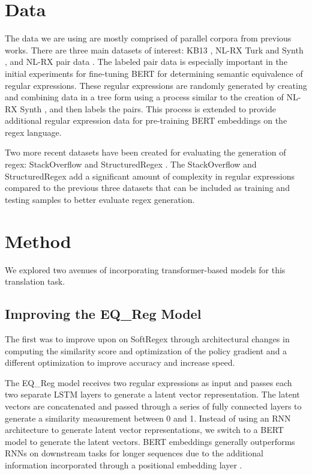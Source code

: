 \documentclass[11pt,a4paper]{article}
\begin{document}
\section{Data}

The data we are using are mostly comprised of parallel corpora from previous works. There are three main datasets of interest: KB13 \cite{kushman-barzilay-2013-using}, NL-RX Turk and Synth \cite{locascio-etal-2016-neural}, and NL-RX pair data \cite{park-etal-2019-softregex}. The labeled pair data is especially important in the initial experiments for fine-tuning BERT for determining semantic equivalence of regular expressions. These regular expressions are randomly generated by creating and combining data in a tree form \cite{park-etal-2019-softregex} using a process similar to the creation of NL-RX Synth \cite{locascio-etal-2016-neural}, and then labels the pairs. This process is extended to provide additional regular expression data for pre-training BERT embeddings on the regex language. 

Two more recent datasets have been created for evaluating the generation of regex: StackOverflow \cite{sketchregex} and StructuredRegex \cite{structuredregex}. The StackOverflow and StructuredRegex add a significant amount of complexity in regular expressions compared to the previous three datasets that can be included as training and testing samples to better evaluate regex generation.

\section{Method}

We explored two avenues of incorporating transformer-based models for this translation task.

\subsection{Improving the EQ\_Reg Model}
The first was to improve upon on SoftRegex through architectural changes in computing the similarity score and optimization of the policy gradient and a different optimization to improve accuracy and increase speed.

The EQ\_Reg model receives two regular expressions as input and passes each two separate LSTM layers to generate a latent vector representation. The latent vectors are concatenated and passed through a series of fully connected layers to generate a similarity measurement between 0 and 1. Instead of using an RNN architecture to generate latent vector representations, we switch to a BERT model to generate the latent vectors. BERT embeddings generally outperforms RNNs on downstream tasks for longer sequences due to the additional information incorporated through a positional embedding layer \cite{devlin-etal-2019-bert}.
\end{document}
